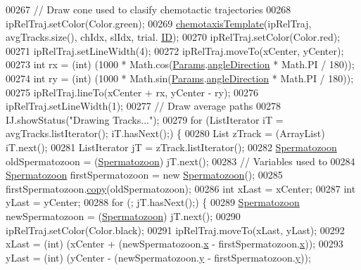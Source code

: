\begin{DoxyCode}
00267     \textcolor{comment}{// Draw cone used to clasify chemotactic trajectories}
00268     ipRelTraj.setColor(Color.green);
00269     \hyperlink{classfunctions_1_1_paint_aaec84e76dfa781152d5fb9ba9c2a46a4}{chemotaxisTemplate}(ipRelTraj, avgTracks.size(), chIdx, slIdx, trial.
      \hyperlink{classdata_1_1_trial_a317298c3409575f71e43acd3f73ce295}{ID});
00270     ipRelTraj.setColor(Color.red);
00271     ipRelTraj.setLineWidth(4);
00272     ipRelTraj.moveTo(xCenter, yCenter);
00273     \textcolor{keywordtype}{int} rx = (int) (1000 * Math.cos(\hyperlink{classdata_1_1_params}{Params}.\hyperlink{classdata_1_1_params_a11ad187f45e1f7add56bde4071bfdf74}{angleDirection} * Math.PI / 180));
00274     \textcolor{keywordtype}{int} ry = (int) (1000 * Math.sin(\hyperlink{classdata_1_1_params}{Params}.\hyperlink{classdata_1_1_params_a11ad187f45e1f7add56bde4071bfdf74}{angleDirection} * Math.PI / 180));
00275     ipRelTraj.lineTo(xCenter + rx, yCenter - ry);
00276     ipRelTraj.setLineWidth(1);
00277     \textcolor{comment}{// Draw average paths}
00278     IJ.showStatus(\textcolor{stringliteral}{"Drawing Tracks..."});
00279     \textcolor{keywordflow}{for} (ListIterator iT = avgTracks.listIterator(); iT.hasNext();) \{
00280       List zTrack = (ArrayList) iT.next();
00281       ListIterator jT = zTrack.listIterator();
00282       \hyperlink{classdata_1_1_spermatozoon}{Spermatozoon} oldSpermatozoon = (\hyperlink{classdata_1_1_spermatozoon}{Spermatozoon}) jT.next();
00283       \textcolor{comment}{// Variables used to}
00284       \hyperlink{classdata_1_1_spermatozoon}{Spermatozoon} firstSpermatozoon = \textcolor{keyword}{new} \hyperlink{classdata_1_1_spermatozoon}{Spermatozoon}();
00285       firstSpermatozoon.\hyperlink{classdata_1_1_spermatozoon_ac4622d389badba1a387ec1e139d35c8e}{copy}(oldSpermatozoon);
00286       \textcolor{keywordtype}{int} xLast = xCenter;
00287       \textcolor{keywordtype}{int} yLast = yCenter;
00288       \textcolor{keywordflow}{for} (; jT.hasNext();) \{
00289         \hyperlink{classdata_1_1_spermatozoon}{Spermatozoon} newSpermatozoon = (\hyperlink{classdata_1_1_spermatozoon}{Spermatozoon}) jT.next();
00290         ipRelTraj.setColor(Color.black);
00291         ipRelTraj.moveTo(xLast, yLast);
00292         xLast = (int) (xCenter + (newSpermatozoon.\hyperlink{classdata_1_1_spermatozoon_ad0da36b2558901e21e7a30f6c227a45e}{x} - firstSpermatozoon.\hyperlink{classdata_1_1_spermatozoon_ad0da36b2558901e21e7a30f6c227a45e}{x}));
00293         yLast = (int) (yCenter - (newSpermatozoon.\hyperlink{classdata_1_1_spermatozoon_aa4f0d3eebc3c443f9be81bf48561a217}{y} - firstSpermatozoon.\hyperlink{classdata_1_1_spermatozoon_aa4f0d3eebc3c443f9be81bf48561a217}{y}));

\end{DoxyCode}
